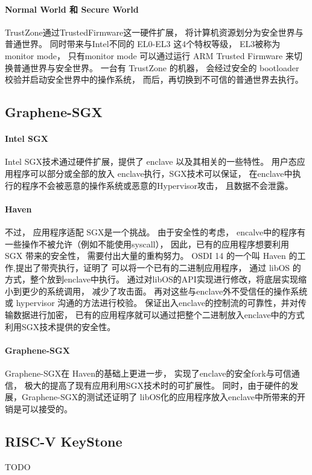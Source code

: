 \paragraph{Normal World 和 Secure World}TrustZone通过TrustedFirmware这一硬件扩展，
将计算机资源划分为安全世界与普通世界。
同时带来与Intel不同的 EL0-EL3 这4个特权等级，
EL3被称为 monitor mode，
只有monitor mode 可以通过运行 ARM Trusted Firmware 来切换普通世界与安全世界。
一台有 TrustZone 的机器，
会经过安全的 bootloader 校验并启动安全世界中的操作系统，
而后，再切换到不可信的普通世界去执行。
\subsection{Graphene-SGX}
\paragraph{Intel SGX}Intel SGX技术通过硬件扩展，提供了 enclave 以及其相关的一些特性。
用户态应用程序可以部分或全部的放入 enclave执行，SGX技术可以保证，
在enclave中执行的程序不会被恶意的操作系统或恶意的Hypervisor攻击，
且数据不会泄露。
\paragraph{Haven}不过，
应用程序适配 SGX是一个挑战。
由于安全性的考虑，
encalve中的程序有一些操作不被允许（例如不能使用syscall），
因此，已有的应用程序想要利用 SGX 带来的安全性，
需要付出大量的重构努力。
OSDI 14 的一个叫 Haven 的工作,提出了带壳执行，证明了
可以将一个已有的二进制应用程序，
通过 libOS 的方式，整个放到enclave中执行。
通过对libOS的API实现进行修改，将底层实现缩小到更少的系统调用，
减少了攻击面。
再对这些与enclave外不受信任的操作系统或 hypervisor 沟通的方法进行校验。
保证出入enclave的控制流的可靠性，并对传输数据进行加密，
已有的应用程序就可以通过把整个二进制放入enclave中的方式利用SGX技术提供的安全性。
\paragraph{Graphene-SGX}Graphene-SGX在 Haven的基础上更进一步，
实现了enclave的安全fork与可信通信，
极大的提高了现有应用利用SGX技术时的可扩展性。
同时，由于硬件的发展，Graphene-SGX的测试还证明了
libOS化的应用程序放入enclave中所带来的开销是可以接受的。

\subsection{RISC-V KeyStone}
TODO

